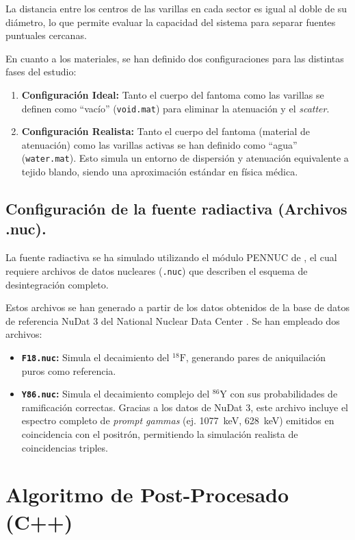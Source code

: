 La distancia entre los centros de las varillas en cada sector es igual al doble de su diámetro, lo que permite evaluar la capacidad del sistema para separar fuentes puntuales cercanas.

En cuanto a los materiales, se han definido dos configuraciones para las distintas fases del estudio:
\begin{enumerate}
  \item \textbf{Configuración Ideal:} Tanto el cuerpo del fantoma como las varillas se definen como \enquote{vacío} (\texttt{void.mat}) para eliminar la atenuación y el \emph{scatter}.
  \item \textbf{Configuración Realista:} Tanto el cuerpo del fantoma (material de atenuación) como las varillas activas se han definido como \enquote{agua} (\texttt{water.mat}). Esto simula un entorno de dispersión y atenuación equivalente a tejido blando, siendo una aproximación estándar en física médica.
\end{enumerate}

\subsection{Configuración de la fuente radiactiva (Archivos .nuc).}

La fuente radiactiva se ha simulado utilizando el módulo PENNUC de \penred, el cual requiere archivos de datos nucleares (\texttt{.nuc}) que describen el esquema de desintegración completo.

Estos archivos se han generado a partir de los datos obtenidos de la base de datos de referencia NuDat 3 del National Nuclear Data Center \parencite{bnlNuDat}. Se han empleado dos archivos:

\begin{itemize}
  \item \textbf{\texttt{F18.nuc}:} Simula el decaimiento del $^{18}\text{F}$, generando pares de aniquilación puros como referencia.
  \item \textbf{\texttt{Y86.nuc}:} Simula el decaimiento complejo del $^{86}\text{Y}$ con sus probabilidades de ramificación correctas. Gracias a los datos de NuDat 3, este archivo incluye el espectro completo de \emph{prompt gammas} (ej. \SI{1077}{\kilo\electronvolt}, \SI{628}{\kilo\electronvolt}) emitidos en coincidencia con el positrón, permitiendo la simulación realista de coincidencias triples.
\end{itemize}



\section{Algoritmo de Post-Procesado (C++)}
\label{sec:metodologia:postprocess}

